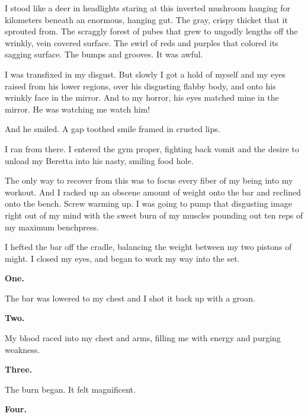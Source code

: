 I stood like a deer in headlights staring at this inverted mushroom
hanging for kilometers beneath an enormous, hanging gut. The gray,
crispy thicket that it sprouted from. The scraggly forest of pubes
that grew to ungodly lengths off the wrinkly, vein covered surface.
The swirl of reds and purples that colored its sagging surface. The
bumps and grooves. It was awful.



I was transfixed in my disgust. But slowly I got a hold of myself
and my eyes raised from his lower regions, over his disgusting
flabby body, and onto his wrinkly face in the mirror. And to my
horror, his eyes matched mine in the mirror. He was watching me
watch him!



And he smiled. A gap toothed smile framed in crusted lips.



I ran from there. I entered the gym proper, fighting back vomit and
the desire to unload my Beretta into his nasty, smiling food
hole.



The only way to recover from this was to focus every fiber of my
being into my workout. And I racked up an obscene amount of weight
onto the bar and reclined onto the bench. Screw warming up. I was
going to pump that disgusting image right out of my mind with the
sweet burn of my muscles pounding out ten reps of my maximum
benchpress.



I hefted the bar off the cradle, balancing the weight between my
two pistons of might. I closed my eyes, and began to work my way
into the set.



{\bf One.}



The bar was lowered to my chest and I shot it back up with a
groan.



{\bf Two.}



My blood raced into my chest and arms, filling me with energy and
purging weakness.



{\bf Three.}



The burn began. It felt magnificent.



{\bf Four.}



